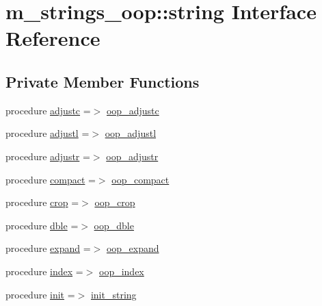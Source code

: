 \hypertarget{structm__strings__oop_1_1string}{}\section{m\+\_\+strings\+\_\+oop\+:\+:string Interface Reference}
\label{structm__strings__oop_1_1string}
\subsection*{Private Member Functions}
\begin{DoxyCompactItemize}
\item 
procedure \hyperlink{structm__strings__oop_1_1string_a00b51e0438ecd366e3a42e28e7b2996b}{adjustc} =$>$ \hyperlink{namespacem__strings__oop_a9fa932c23648e737230553a8e7bfb15b}{oop\+\_\+adjustc}
\item 
procedure \hyperlink{structm__strings__oop_1_1string_a1f88b4f2a38506e18657f3f1a62e98f9}{adjustl} =$>$ \hyperlink{namespacem__strings__oop_a8e2457b4a1c4489e9600e340fa9ce533}{oop\+\_\+adjustl}
\item 
procedure \hyperlink{structm__strings__oop_1_1string_a07c71514613acbde4215d06e493b807b}{adjustr} =$>$ \hyperlink{namespacem__strings__oop_abb0dfa5646259e4fc768700eada111ac}{oop\+\_\+adjustr}
\item 
procedure \hyperlink{structm__strings__oop_1_1string_a1b65e2e71aeaa708ae264e0b49c26734}{compact} =$>$ \hyperlink{namespacem__strings__oop_ac02aecbaebcf57833b544de4f50c89a6}{oop\+\_\+compact}
\item 
procedure \hyperlink{structm__strings__oop_1_1string_a56c652bda0c81f09810f81fceb220d14}{crop} =$>$ \hyperlink{namespacem__strings__oop_aa1a395d359592720a842054fd0aaff0a}{oop\+\_\+crop}
\item 
procedure \hyperlink{structm__strings__oop_1_1string_af56cb5026861cde949c6c08a3781f18e}{dble} =$>$ \hyperlink{namespacem__strings__oop_aa6eaf2b8a12a905d0ebaa21a84871dec}{oop\+\_\+dble}
\item 
procedure \hyperlink{structm__strings__oop_1_1string_a2c773ed4625515239ebe1867d749a155}{expand} =$>$ \hyperlink{namespacem__strings__oop_a5b96d2a6f242a096cd5788cf0802e825}{oop\+\_\+expand}
\item 
procedure \hyperlink{structm__strings__oop_1_1string_aa4f1aaf5ef49e9332b96c7e0b0c47ab3}{index} =$>$ \hyperlink{namespacem__strings__oop_aafe02b26ccba21eb8a35e9fa99d6c790}{oop\+\_\+index}
\item 
procedure \hyperlink{structm__strings__oop_1_1string_a1fddf0e12658a1547b8f4a577309062a}{init} =$>$ \hyperlink{namespacem__strings__oop_a1510c1de10cb182598ce6a399a734be0}{init\+\_\+string}

\end{DoxyCompactItemize}
